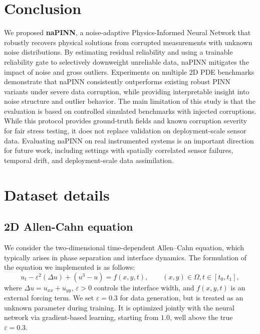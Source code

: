 \documentclass{article}
\theoremstyle{plain}
\theoremstyle{definition}
\theoremstyle{remark}
\begin{document}
\section{Conclusion}

We proposed \textbf{naPINN}, a noise-adaptive Physics-Informed Neural Network that robustly recovers physical solutions from corrupted measurements with unknown noise distributions. By estimating residual reliability and using a trainable reliability gate to selectively downweight unreliable data, naPINN mitigates the impact of noise and gross outliers. Experiments on multiple 2D PDE benchmarks demonstrate that naPINN consistently outperforms existing robust PINN variants under severe data corruption, while providing interpretable insight into noise structure and outlier behavior. The main limitation of this study is that the evaluation is based on controlled simulated benchmarks with injected corruptions. While this protocol provides ground-truth fields and known corruption severity for fair stress testing, it does not replace validation on deployment-scale sensor data. Evaluating naPINN on real instrumented systems is an important direction for future work, including settings with spatially correlated sensor failures, temporal drift, and deployment-scale data assimilation.

\clearpage



\medskip


\clearpage
\appendix

\section{Dataset details}
\label{appendix:DatasetDetails}

\subsection{2D Allen-Cahn equation}

We consider the two-dimensional time-dependent Allen--Cahn equation, which typically arises in phase separation and interface dynamics. The formulation of the equation we implemented is as follows:
\begin{equation}
u_t - \varepsilon^2 (\Delta u) + (u^3 - u) = f(x,y,t),
\qquad (x,y) \in \Omega, t \in [t_0, t_1],
\end{equation}
where $\Delta u = u_{xx} + u_{yy}$, $\varepsilon > 0$ controls the interface width, and $f(x,y,t)$ is an external forcing term. We set $\varepsilon = 0.3$ for data generation, but is treated as an unknown parameter during training. It is optimized jointly with the neural network via gradient-based learning, starting from $1.0$, well above the true $\varepsilon=0.3$.
\end{document}
